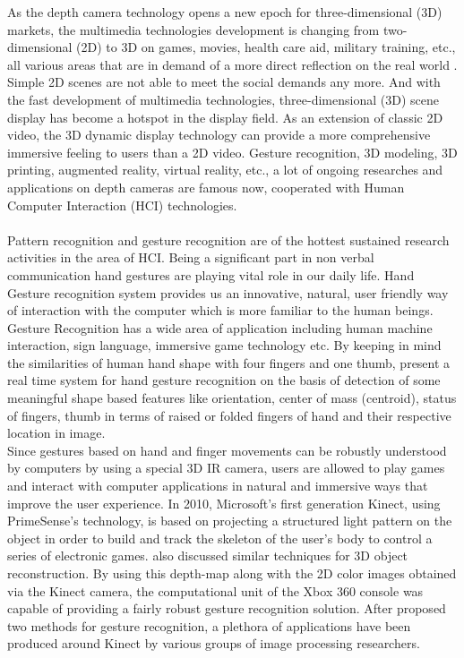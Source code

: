 As the depth camera technology opens a new epoch for three-dimensional (3D) markets, the multimedia technologies development is changing from two-dimensional (2D) to 3D on games, movies, health care aid, military training, etc., all various areas that are in demand of a more direct reflection on the real world \cite{depthOverview12}. Simple 2D scenes are not able to meet the social demands any more. And with the fast development of multimedia technologies, three-dimensional (3D) scene display has become a hotspot in the display field. As an extension of classic 2D video, the 3D dynamic display technology can provide a more comprehensive immersive feeling to users than a 2D video. Gesture recognition, 3D modeling, 3D printing, augmented reality, virtual reality, etc., a lot of ongoing researches and applications on depth cameras are famous now, cooperated with Human Computer Interaction (HCI) technologies.
\\\\%
Pattern recognition and gesture recognition are of the hottest sustained research activities in the area of HCI. Being a significant part in non verbal communication hand gestures are playing vital role in our daily life. Hand Gesture recognition system provides us an innovative, natural, user friendly way of interaction with the computer which is more familiar to the human beings. Gesture Recognition has a wide area of application including human machine interaction, sign language, immersive game technology etc. By keeping in mind the similarities of human hand shape with four fingers and one thumb, \cite{gestureRecognition12} present a real time system for hand gesture recognition on the basis of detection of some meaningful shape based features like orientation, center of mass (centroid), status of fingers, thumb in terms of raised or folded fingers of hand and their respective location in image.
\\%
Since gestures based on hand and finger movements can be robustly understood by computers by using a special 3D IR camera, users are allowed to play games and interact with computer applications in natural and immersive ways that improve the user experience. In 2010, Microsoft's first generation Kinect, using PrimeSense’s technology, is based on projecting a structured light pattern on the object in order to build and track the skeleton of the user’s body to control a series of electronic games. \cite{SL3Dfrom2D96} also discussed similar techniques for 3D object reconstruction. By using this depth-map along with the 2D color images obtained via the Kinect camera, the computational unit of the Xbox 360 console was capable of providing a fairly robust gesture recognition solution. After \cite{KinectGesture12} proposed two methods for gesture recognition, a plethora of applications have been produced around Kinect by various groups of image processing researchers.
